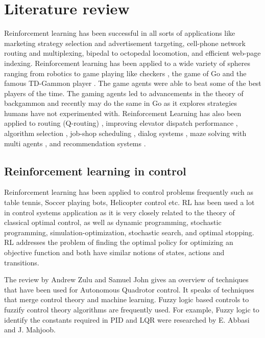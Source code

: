 \documentclass[hidelinks,BTech]{iitmdiss}
\begin{document}
\chapter{Literature review}
Reinforcement learning has been successful in all sorts of applications like marketing strategy selection and advertisement targeting, cell-phone network routing and multiplexing, bipedal to octopedal locomotion, and efficient web-page indexing.
Reinforcement learning has been applied to a wide variety of spheres ranging from robotics \cite{HelicopterPegasus} to game playing like checkers \cite{RLInCheckers}, the game of Go \cite{RLInGo} and the famous TD-Gammon player \cite{RLInBackgammon}. The game agents were able to beat some of the best players of the time. The gaming agents led to advancements in the theory of backgammon and recently may do the same in Go as it explores strategies humans have not experimented with. Reinforcement Learning has also been applied to routing (Q-routing) \cite{RLInQRouting},
improving elevator dispatch performance \cite{RLInElevators}, algorithm selection \cite{RLInAlgoSelection}, job-shop scheduling \cite{RLInJobShopScheduling}, dialog systems \cite{RLInDialogSystems}, maze solving with multi agents \cite{PredatorPrey}, and recommendation systems \cite{RLInRecommenders}.

\section{Reinforcement learning in control}
Reinforcement learning has been applied to control problems frequently such as table tennis\cite{TableTennisRL}, Soccer playing bots\cite{RobocupRL}, Helicopter control\cite{HelicopterPegasus} etc. RL has been used a lot in control systems application as it is very closely related to the theory of classical optimal control, as well as dynamic programming, stochastic programming, simulation-optimization, stochastic search, and optimal stopping. RL addresses the problem of finding the optimal policy for optimizing an objective function and both have similar notions of states, actions and transitions.

The review \cite{ControlForQuads} by Andrew Zulu and Samuel John gives an overview of techniques that have been used for Autonomous Quadrotor control. It speaks of techniques that merge control theory and machine learning. Fuzzy logic based controls to fuzzify control theory algorithms are frequently used. For example, Fuzzy logic to identify the constants required in PID and LQR were researched by E. Abbasi and J. Mahjoob.
\end{document}

